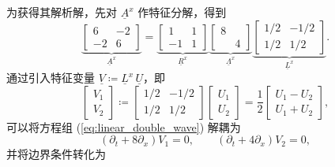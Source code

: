 为获得其解析解，先对 $\underline{A}^{x}$ 作特征分解，得到
\begin{equation}
\underbrace{\begin{bmatrix}6 & -2\\
-2 & 6
\end{bmatrix}}_{\underline{A}^{x}}=\underbrace{\begin{bmatrix}1 & 1\\
-1 & 1
\end{bmatrix}}_{\underline{R}^{x}}\underbrace{\begin{bmatrix}8\\
 & 4
\end{bmatrix}}_{\underline{\varLambda}^{x}}\underbrace{\begin{bmatrix}1/2 & -1/2\\
1/2 & 1/2
\end{bmatrix}}_{\underline{L}^{x}}.
\end{equation}
通过引入特征变量 $\underline{V}\coloneqq\underline{L}^{x}\,\underline{U}$，即
\begin{equation}
\begin{bmatrix}V_{1}\\
V_{2}
\end{bmatrix}\coloneqq\begin{bmatrix}1/2 & -1/2\\
1/2 & 1/2
\end{bmatrix}\begin{bmatrix}U_{1}\\
U_{2}
\end{bmatrix}=\frac{1}{2}\begin{bmatrix}U_{1}-U_{2}\\
U_{1}+U_{2}
\end{bmatrix},
\end{equation}
可以将方程组 (\ref{eq:linear_double_wave}) 解耦为
\begin{equation}
\left(\partial_{t}+8\partial_{x}\right)V_{1}=0,\qquad\left(\partial_{t}+4\partial_{x}\right)V_{2}=0,
\end{equation}
并将边界条件转化为

\newpage{}

